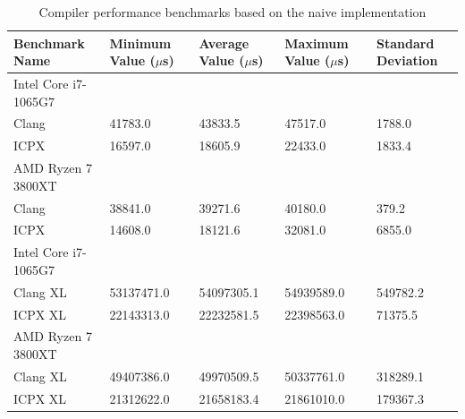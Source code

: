 \documentclass[modern,longauthor]{aastex7}
\begin{document}
\begin{table}[htb!]
\centering
\caption{Compiler performance benchmarks based on the naive implementation\label{tab:icpx}}
\begin{tabular}{p{5cm} p{2cm} p{2cm} p{2cm} p{2cm}}
\hline
Benchmark Name & Minimum Value ($\mu$s) & Average Value ($\mu$s) & Maximum Value ($\mu$s) & Standard Deviation \\
\hline
Intel Core i7-1065G7 \\
\hspace{0.5cm}Clang & 41783.0 & 43833.5 & 47517.0 & 1788.0 \\
\hspace{0.5cm}ICPX & 16597.0 & 18605.9 & 22433.0 & 1833.4 \\
AMD Ryzen 7 3800XT \\
\hspace{0.5cm}Clang & 38841.0 & 39271.6 & 40180.0 & 379.2 \\
\hspace{0.5cm}ICPX & 14608.0 & 18121.6 & 32081.0 & 6855.0 \\
\hline
Intel Core i7-1065G7 \\
\hspace{0.5cm}Clang XL & 53137471.0 & 54097305.1 & 54939589.0 & 549782.2 \\
\hspace{0.5cm}ICPX XL & 22143313.0 & 22232581.5 & 22398563.0 & 71375.5 \\
AMD Ryzen 7 3800XT \\
\hspace{0.5cm}Clang XL & 49407386.0 & 49970509.5 & 50337761.0 & 318289.1 \\
\hspace{0.5cm}ICPX XL & 21312622.0 & 21658183.4 & 21861010.0 & 179367.3 \\
\hline
\end{tabular}
\end{table}
\FloatBarrier
\end{document}
